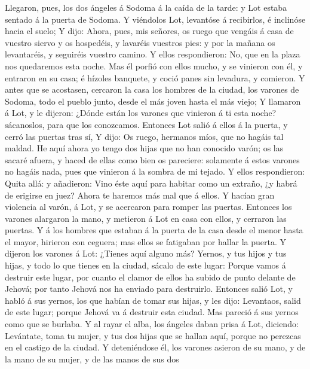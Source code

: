  Llegaron, pues, los dos ángeles á Sodoma á la caída de la
tarde: y Lot estaba sentado á la puerta de Sodoma. Y viéndolos Lot,
levantóse á recibirlos, é inclinóse hacia el suelo;  Y dijo:
Ahora, pues, mis señores, os ruego que vengáis á casa de vuestro siervo
y os hospedéis, y lavaréis vuestros pies: y por la mañana os
levantaréis, y seguiréis vuestro camino. Y ellos respondieron: No, que
en la plaza nos quedaremos esta noche.  Mas él porfió con
ellos mucho, y se vinieron con él, y entraron en su casa; é hízoles
banquete, y coció panes sin levadura, y comieron.  Y antes
que se acostasen, cercaron la casa los hombres de la ciudad, los varones
de Sodoma, todo el pueblo junto, desde el más joven hasta el más viejo;
 Y llamaron á Lot, y le dijeron: ¿Dónde están los varones
que vinieron á ti esta noche? sácanoslos, para que los conozcamos.
 Entonces Lot salió á ellos á la puerta, y cerró las puertas
tras sí,  Y dijo: Os ruego, hermanos míos, que no hagáis tal
maldad.  He aquí ahora yo tengo dos hijas que no han
conocido varón; os las sacaré afuera, y haced de ellas como bien os
pareciere: solamente á estos varones no hagáis nada, pues que vinieron á
la sombra de mi tejado.  Y ellos respondieron: Quita allá: y
añadieron: Vino éste aquí para habitar como un extraño, ¿y habrá de
erigirse en juez? Ahora te haremos más mal que á ellos. Y hacían gran
violencia al varón, á Lot, y se acercaron para romper las puertas.
 Entonces los varones alargaron la mano, y metieron á Lot
en casa con ellos, y cerraron las puertas.  Y á los hombres
que estaban á la puerta de la casa desde el menor hasta el mayor,
hirieron con ceguera; mas ellos se fatigaban por hallar la puerta.
 Y dijeron los varones á Lot: ¿Tienes aquí alguno más?
Yernos, y tus hijos y tus hijas, y todo lo que tienes en la ciudad,
sácalo de este lugar:  Porque vamos á destruir este lugar,
por cuanto el clamor de ellos ha subido de punto delante de Jehová; por
tanto Jehová nos ha enviado para destruirlo.  Entonces
salió Lot, y habló á sus yernos, los que habían de tomar sus hijas, y
les dijo: Levantaos, salid de este lugar; porque Jehová va á destruir
esta ciudad. Mas pareció á sus yernos como que se burlaba. 
Y al rayar el alba, los ángeles daban prisa á Lot, diciendo: Levántate,
toma tu mujer, y tus dos hijas que se hallan aquí, porque no perezcas en
el castigo de la ciudad.  Y deteniéndose él, los varones
asieron de su mano, y de la mano de su mujer, y de las manos de sus dos
